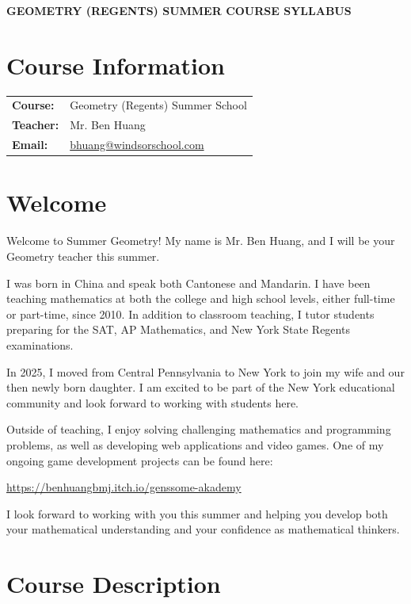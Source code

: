 \documentclass[10pt]{article}
\begin{document}
\begin{center}
    {\LARGE\bfseries GEOMETRY (REGENTS) SUMMER COURSE SYLLABUS}
\end{center}

\section*{Course Information}

\begin{tabular}{ll}
\textbf{Course:} & Geometry (Regents) Summer School \\
\textbf{Teacher:} & Mr. Ben Huang \\
\textbf{Email:} & \href{mailto:bhuang@windsorschool.com}{bhuang@windsorschool.com}
\end{tabular}

\section*{Welcome}

Welcome to Summer Geometry! My name is Mr. Ben Huang, and I will be your Geometry teacher this summer.

I was born in China and speak both Cantonese and Mandarin. I have been teaching mathematics at both the college and high school levels, either full-time or part-time, since 2010. In addition to classroom teaching, I tutor students preparing for the SAT, AP Mathematics, and New York State Regents examinations.

In 2025, I moved from Central Pennsylvania to New York to join my wife and our then newly born daughter. I am excited to be part of the New York educational community and look forward to working with students here.

Outside of teaching, I enjoy solving challenging mathematics and programming problems, as well as developing web applications and video games. One of my ongoing game development projects can be found here:

\medskip

\noindent
\url{https://benhuangbmj.itch.io/genssome-akademy}

\medskip

I look forward to working with you this summer and helping you develop both your mathematical understanding and your confidence as mathematical thinkers.

\section*{Course Description}
\end{document}
